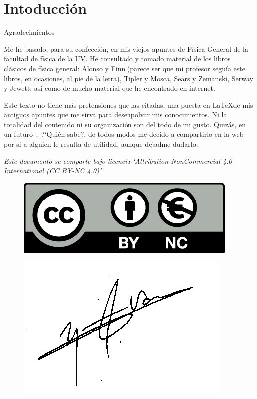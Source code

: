 \section{Intoducción}



\justify

\begin{resumen}{Agradecimientos}

Me he basado, para su confección, en mis viejos apuntes de Física General de la facultad de física de la UV. He consultado y tomado material de los libros clásicos de física general: Alonso y Finn (parece ser que mi profesor seguía este libros, en ocasiones, al pie de la letra), Tipler y Mosca, Sears y Zemanski, Serway y Jewett; así como de mucho material que he encontrado en internet. 

Este texto no tiene más pretensiones que las citadas, una puesta en \LaTeX de mis antiguos apuntes que me sirva para desenpolvar mis conocimientos. Ni la totalidad del contenido ni su organización son del todo de mi gusto. Quizás, en un futuro .. ?`Quién sabe?, de todos modos me decido a compartirlo en la web por si a alguien le resulta de utilidad, aunque dejadme dudarlo. 
\end{resumen}





\vspace{5mm}
\emph{Este documento se comparte bajo licencia `Attribution-NonCommercial 4.0 International (CC BY-NC 4.0)'}
\vspace{5mm}

\begin{multicols}{2}
\begin{figure}[H]
	\centering
	\includegraphics[width=.4
	\textwidth]{imagenes/imagenes00/licencia.png}
\end{figure}
\begin{figure}[H]
	\centering
	\includegraphics[width=.3
	\textwidth]{imagenes/firma.png}
\end{figure}
\end{multicols}

